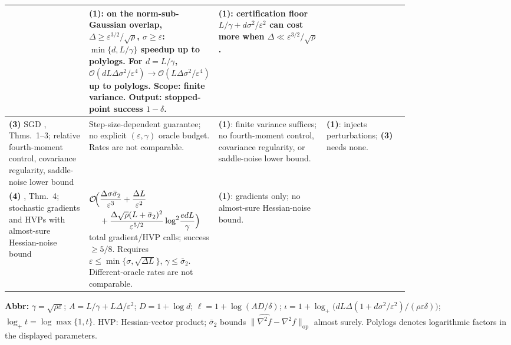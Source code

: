 \begin{table}[tp]
\begin{threeparttable}
\begin{tabularx}{\linewidth}{@{}>{\raggedright\arraybackslash}p{0.20\linewidth}>{\raggedright\arraybackslash}p{0.32\linewidth}>{\raggedright\arraybackslash}p{0.27\linewidth}>{\raggedright\arraybackslash}X@{}}
& \textbf{(1)}: on the norm-sub-Gaussian overlap, $\Delta\ge\varepsilon^{3/2}/\sqrt\rho$, $\sigma\ge\varepsilon$: $\min\{d,L/\gamma\}$ speedup up to polylogs. For $d=L/\gamma$, $\mathcal{O}(dL\Delta\sigma^2/\varepsilon^4)\to\mathcal{O}(L\Delta\sigma^2/\varepsilon^4)$ up to polylogs. Scope: finite variance. Output: stopped-point success $1-\delta$.
& \textbf{(1)}: certification floor $L/\gamma+d\sigma^2/\varepsilon^2$ can cost more when $\Delta\ll\varepsilon^{3/2}/\sqrt\rho$.
\\
\midrule
\textbf{(3)} SGD \citep{vosVlaski2019v1}, Thms.~1--3; relative fourth-moment control, covariance regularity, saddle-noise lower bound
& Step-size-dependent guarantee; no explicit $(\varepsilon,\gamma)$ oracle budget. Rates are not comparable.
& \textbf{(1)}: finite variance suffices; no fourth-moment control, covariance regularity, or saddle-noise lower bound.
& \textbf{(1)}: injects perturbations; \textbf{(3)} needs none.
\\
\midrule
\textbf{(4)} \citep{hthvArjevani2020v1}, Thm.~4; stochastic gradients and HVPs with almost-sure Hessian-noise bound
& $\begin{aligned}\mathcal{O}\!\Bigl(&\frac{\Delta\sigma\bar\sigma_2}{\varepsilon^3}+\frac{\Delta L}{\varepsilon^2}\\&+\frac{\Delta\sqrt\rho(L+\bar\sigma_2)^2}{\varepsilon^{5/2}}\log^2\!\frac{edL}{\gamma}\Bigr)\end{aligned}$ total gradient/HVP calls; success $\ge5/8$. Requires $\varepsilon\le\min\{\sigma,\sqrt{\Delta L}\}$, $\gamma\le\bar\sigma_2$. Different-oracle rates are not comparable.
& \textbf{(1)}: gradients only; no almost-sure Hessian-noise bound.
& \\
\bottomrule
\end{tabularx}
\begin{tablenotes}[flushleft]\footnotesize
\item[] \textbf{Abbr:} $\gamma=\sqrt{\rho\varepsilon}$; $A=L/\gamma+L\Delta/\varepsilon^2$; $D=1+\log d$; $\ell=1+\log(AD/\delta)$; $\iota=1+\log_+\!\bigl(dL\Delta(1+d\sigma^2/\varepsilon^2)/(\rho\varepsilon\delta)\bigr)$; $\log_+t=\log\max\{1,t\}$. HVP: Hessian-vector product; $\bar\sigma_2$ bounds $\|\widehat{\nabla^2 f}-\nabla^2 f\|_{\mathrm{op}}$ almost surely. Polylogs denotes logarithmic factors in the displayed parameters.
\end{tablenotes}
\end{threeparttable}
\end{table}
\clearpage
